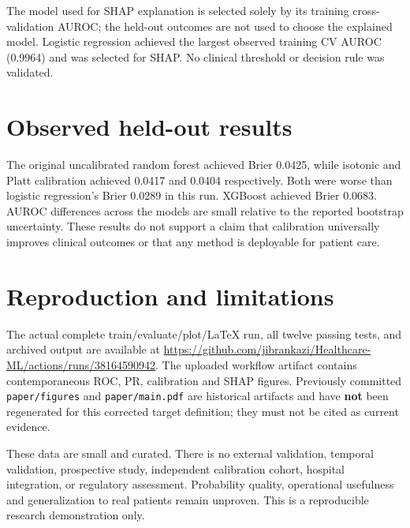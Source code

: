 \documentclass[10pt]{article}
\begin{document}
The model used for SHAP explanation is selected solely by its training
cross-validation AUROC; the held-out outcomes are not used to choose
the explained model. Logistic regression achieved the largest observed
training CV AUROC (0.9964) and was selected for SHAP. No clinical
threshold or decision rule was validated.

\section{Observed held-out results}


The original uncalibrated random forest achieved Brier 0.0425, while
isotonic and Platt calibration achieved 0.0417 and 0.0404 respectively.
Both were worse than logistic regression's Brier 0.0289 in this run.
XGBoost achieved Brier 0.0683. AUROC differences across the models are
small relative to the reported bootstrap uncertainty. These results
do not support a claim that calibration universally improves clinical
outcomes or that any method is deployable for patient care.

\section{Reproduction and limitations}
The actual complete train/evaluate/plot/LaTeX run, all twelve passing
tests, and archived output are available at
\url{https://github.com/jibrankazi/Healthcare-ML/actions/runs/38164590942}.
The uploaded workflow artifact contains contemporaneous ROC, PR,
calibration and SHAP figures. Previously committed \texttt{paper/figures}
and \texttt{paper/main.pdf} are historical artifacts and have
\textbf{not} been regenerated for this corrected target definition;
they must not be cited as current evidence.

These data are small and curated. There is no external validation,
temporal validation, prospective study, independent calibration cohort,
hospital integration, or regulatory assessment. Probability quality,
operational usefulness and generalization to real patients remain
unproven. This is a reproducible research demonstration only.
\end{document}
